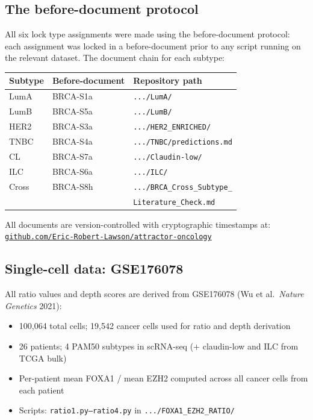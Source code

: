 \documentclass[12pt, a4paper]{article}
\begin{document}
\subsection{The before-document protocol}

All six lock type assignments were made using the
before-document protocol: each assignment was locked
in a before-document prior to any script running on
the relevant dataset. The document chain for each
subtype:

\begin{center}
\begin{tabular}{p{2.5cm}p{3cm}p{7cm}}
\toprule
\textbf{Subtype} & \textbf{Before-document}
& \textbf{Repository path} \\
\midrule
LumA   & BRCA-S1a & \texttt{.../LumA/} \\
LumB   & BRCA-S5a & \texttt{.../LumB/} \\
HER2   & BRCA-S3a & \texttt{.../HER2\_ENRICHED/} \\
TNBC   & BRCA-S4a & \texttt{.../TNBC/predictions.md} \\
CL     & BRCA-S7a & \texttt{.../Claudin-low/} \\
ILC    & BRCA-S6a & \texttt{.../ILC/} \\
Cross  & BRCA-S8h & \texttt{.../BRCA\_Cross\_Subtype\_}\\
       &          & \texttt{Literature\_Check.md} \\
\bottomrule
\end{tabular}
\end{center}

All documents are version-controlled with cryptographic
timestamps at:
\href{https://github.com/Eric-Robert-Lawson/attractor-oncology}
{\texttt{github.com/Eric-Robert-Lawson/attractor-oncology}}

\subsection{Single-cell data: GSE176078}

All ratio values and depth scores are derived from
GSE176078 (Wu et al.\ \textit{Nature Genetics} 2021):
\begin{itemize}[noitemsep]
  \item 100,064 total cells; 19,542 cancer cells
        used for ratio and depth derivation
  \item 26 patients; 4 PAM50 subtypes in scRNA-seq
        ($+$ claudin-low and ILC from TCGA bulk)
  \item Per-patient mean FOXA1 / mean EZH2 computed
        across all cancer cells from each patient
  \item Scripts: \texttt{ratio1.py--ratio4.py} in
        \texttt{.../FOXA1\_EZH2\_RATIO/}
\end{itemize}
\end{document}
